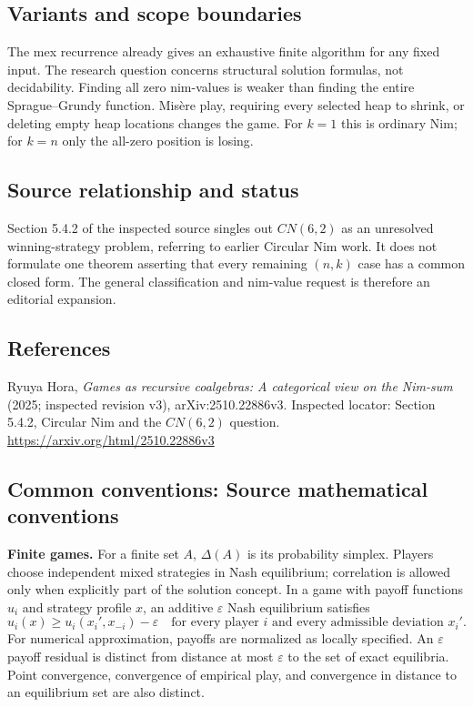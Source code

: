 \documentclass[11pt,a4paper]{article}
\begin{document}
\subsection*{Variants and scope boundaries}
The mex recurrence already gives an exhaustive finite algorithm for any fixed input. The research question concerns structural solution formulas, not decidability. Finding all zero nim-values is weaker than finding the entire Sprague--Grundy function. Mis\`ere play, requiring every selected heap to shrink, or deleting empty heap locations changes the game. For $k=1$ this is ordinary Nim; for $k=n$ only the all-zero position is losing.

\subsection*{Source relationship and status}
Section 5.4.2 of the inspected source singles out $CN(6,2)$ as an unresolved winning-strategy problem, referring to earlier Circular Nim work. It does not formulate one theorem asserting that every remaining $(n,k)$ case has a common closed form. The general classification and nim-value request is therefore an editorial expansion.

\subsection*{References}
\begingroup\footnotesize\raggedright
\noindent [S1] Ryuya Hora, \emph{Games as recursive coalgebras: A categorical view on the Nim-sum} (2025; inspected revision v3), arXiv:2510.22886v3. Inspected locator: Section 5.4.2, Circular Nim and the $CN(6,2)$ question.
\url{https://arxiv.org/html/2510.22886v3}
\par\endgroup

\subsection*{Common conventions: Source mathematical conventions}

\textbf{Finite games.} For a finite set $A$, $\Delta(A)$ is its probability
simplex. Players choose independent mixed strategies in Nash equilibrium;
correlation is allowed only when explicitly part of the solution concept.
In a game with payoff functions $u_i$ and strategy profile $x$, an additive
$\varepsilon$ Nash equilibrium satisfies
\[
 u_i(x)\geq u_i(x_i',x_{-i})-\varepsilon
 \quad\text{for every player $i$ and every admissible deviation $x_i'$}.
\]
For numerical approximation, payoffs are normalized as locally specified.
An $\varepsilon$ payoff residual is distinct from distance at most
$\varepsilon$ to the set of exact equilibria. Point convergence, convergence
of empirical play, and convergence in distance to an equilibrium set are
also distinct.
\end{document}
